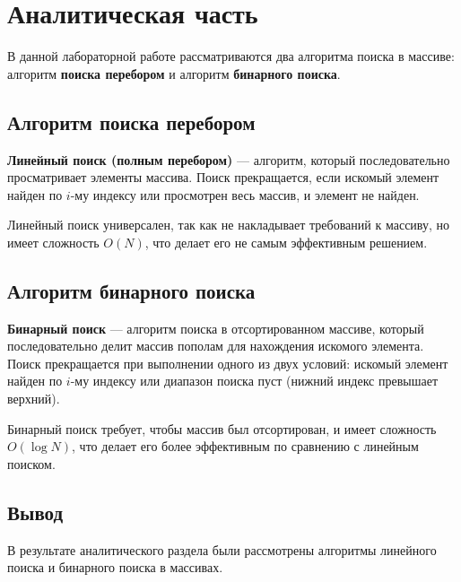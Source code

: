 \chapter{Аналитическая часть}

В данной лабораторной работе рассматриваются два алгоритма поиска в массиве: алгоритм \textbf{поиска перебором} и алгоритм \textbf{бинарного поиска}.

\section{Алгоритм поиска перебором}

\textbf{Линейный поиск (полным перебором)} — алгоритм, который последовательно просматривает элементы массива. Поиск прекращается, если искомый элемент найден по \(i\)-му индексу или просмотрен весь массив, и элемент не найден.

Линейный поиск универсален, так как не накладывает требований к массиву, но имеет сложность \(O(N)\), что делает его не самым эффективным решением. \cite{knuth}

\section{Алгоритм бинарного поиска}

\textbf{Бинарный поиск} — алгоритм поиска в отсортированном массиве, который последовательно делит массив пополам для нахождения искомого элемента. Поиск прекращается при выполнении одного из двух условий: искомый элемент найден по \(i\)-му индексу или диапазон поиска пуст (нижний индекс превышает верхний).

Бинарный поиск требует, чтобы массив был отсортирован, и имеет сложность \(O(\log N)\), что делает его более эффективным по сравнению с линейным поиском. \cite{knuth}

\section{Вывод}

В результате аналитического раздела были рассмотрены алгоритмы линейного поиска и бинарного поиска в массивах.

\clearpage